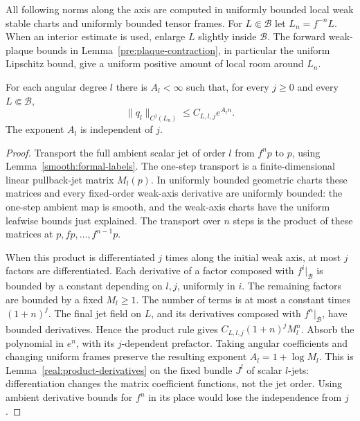 All following norms along the axis are computed in uniformly bounded
local weak stable charts and uniformly bounded tensor frames.  For
$L\Subset\mathcal B$ let $L_n=f^{-n}L$.  When an interior estimate is
used, enlarge $L$ slightly inside $\mathcal B$. The forward weak-plaque
bounds in Lemma~\ref{pre:plaque-contraction}, in particular the uniform
Lipschitz bound, give a uniform positive amount of local room around $L_n$.

\begin{lemma}
\label{smooth:naive}
For each angular degree $l$ there is $A_l<\infty$ such that, for every
$j\geq0$ and every $L\Subset\mathcal B$,
\begin{equation}
 \label{smooth:naive-bound}
 \|q_l\|_{C^j(L_n)}\leq C_{L,l,j}e^{A_ln}.
\end{equation}
The exponent $A_l$ is independent of $j$.
\end{lemma}

\begin{proof}
Transport the full ambient scalar jet of order $l$ from $f^np$ to $p$,
using Lemma~\ref{smooth:formal-labels}.  The one-step transport is a
finite-dimensional linear pullback-jet matrix $M_l(p)$.  In uniformly
bounded geometric charts these matrices and every fixed-order weak-axis
derivative are uniformly bounded: the one-step ambient map is smooth,
and the weak-axis charts have the uniform leafwise bounds just
explained.  The transport over $n$ steps is the product of these matrices
at $p,fp,\ldots,f^{n-1}p$.

When this product is differentiated $j$ times along the initial weak
axis, at most $j$ factors are differentiated.  Each derivative of a
factor composed with $f^i|_{\mathcal B}$ is bounded by a constant
depending on $l,j$, uniformly in $i$.  The remaining factors are bounded
by a fixed $M_l\geq1$.  The number of terms is at most a constant times
$(1+n)^j$.  The final jet field on $L$, and its derivatives composed with
$f^n|_{\mathcal B}$, have bounded derivatives.  Hence the product rule
gives $C_{L,l,j}(1+n)^jM_l^n$.  Absorb the polynomial in $e^n$, with its
$j$-dependent prefactor.  Taking angular coefficients and changing
uniform frames preserve the resulting exponent $A_l=1+\log M_l$.
This is Lemma~\ref{real:product-derivatives} on the fixed bundle
$J^l$ of scalar $l$-jets: differentiation changes the matrix
coefficient functions, not the jet order. Using ambient derivative bounds
for $f^n$ in its place would lose the independence from $j$.
\end{proof}

